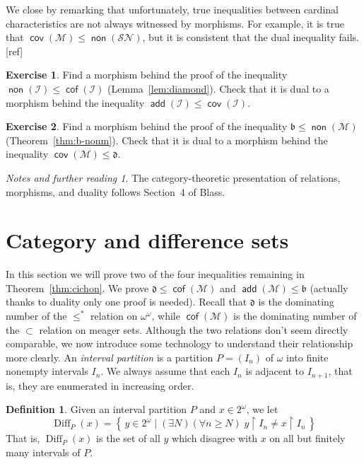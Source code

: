 \documentclass[11pt,oneside]{amsbook}
\newcommand{\set}[1]{\left\{\,#1\,\right\}}
\newcommand{\Meager}{\mathcal M}
\DeclareMathOperator{\add}{\mathsf{add}}
\DeclareMathOperator{\non}{\mathsf{non}}
\DeclareMathOperator{\cov}{\mathsf{cov}}
\DeclareMathOperator{\cof}{\mathsf{cof}}
\DeclareMathOperator{\Diff}{Diff}
\theoremstyle{definition}
\newtheorem{exerc}{Exercise}[section]
\theoremstyle{plain}
\theoremstyle{definition}
\newtheorem{definition}[theorem]{Definition}
\theoremstyle{remark}
\newtheorem*{notes}{Notes and further reading}
\numberwithin{equation}{section}
\numberwithin{figure}{section}
\begin{document}
We close by remarking that unfortunately, true inequalities between cardinal characteristics are not always witnessed by morphisms. For example, it is true that $\cov(\Meager)\leq\non(\mathcal{SN})$, but it is consistent that the dual inequality fails.
[ref] %

\begin{exerc}
  Find a morphism behind the proof of the inequality $\non(\mathcal I)\leq\cof(\mathcal I)$ (Lemma~\ref{lem:diamond}). Check that it is dual to a morphism behind the inequality $\add(\mathcal I)\leq\cov(\mathcal I)$.
\end{exerc}

\begin{exerc}
  Find a morphism behind the proof of the inequality $\mathfrak b\leq\non(\Meager)$ (Theorem~\ref{thm:b-nonm}). Check that it is dual to a morphism behind the inequality $\cov(\Meager)\leq\mathfrak d$.
\end{exerc}

\begin{notes}
  The category-theoretic presentation of relations, morphisms, and duality follows Section~4 of Blass.
\end{notes}


\newpage
\section{Category and difference sets}

In this section we will prove two of the four inequalities remaining in Theorem~\ref{thm:cichon}. We prove $\mathfrak d\leq\cof(\Meager)$ and $\add(\Meager)\leq\mathfrak b$ (actually thanks to duality only one proof is needed). Recall that $\mathfrak d$ is the dominating number of the $\leq^*$ relation on $\omega^\omega$, while $\cof(\Meager)$ is the dominating number of the $\subset$ relation on meager sets. Although the two relations don't seem directly comparable, we now introduce some technology to understand their relationship more clearly. An \emph{interval partition} is a partition $P=(I_n)$ of $\omega$ into finite nonempty intervals $I_n$. We always assume that each $I_n$ is adjacent to $I_{n+1}$, that is, they are enumerated in increasing order.

\begin{definition}
  Given an interval partition $P$ and $x\in2^\omega$, we let
  \[\Diff_P(x)=\set{y\in2^\omega\mid (\exists N)(\forall n\geq N)\;y\restriction I_n\neq x\restriction I_n}
  \]
  That is, $\Diff_P(x)$ is the set of all $y$ which disagree with $x$ on all but finitely many intervals of $P$.
\end{definition}
\end{document}
